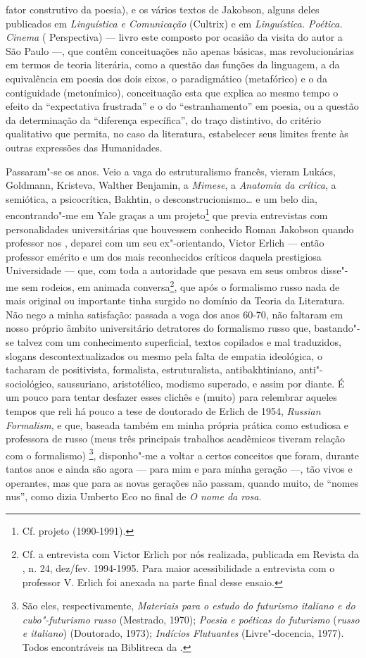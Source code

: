fator construtivo da poesia), e os vários textos de Jakobson, alguns
deles publicados em \emph{Linguística e Comunicação} (Cultrix) e em
\emph{Linguística. Poética. Cinema} ( Perspectiva) --- livro este composto
por ocasião da visita do autor a São Paulo ---, que contêm conceituações
não apenas básicas, mas revolucionárias em termos de teoria literária,
como a questão das funções da linguagem, a da equivalência em poesia dos
dois eixos, o paradigmático (metafórico) e o da contiguidade
(metonímico), conceituação esta que explica ao mesmo tempo o efeito da
``expectativa frustrada'' e o do ``estranhamento'' em poesia, ou a
questão da determinação da ``diferença específica'', do traço
distintivo, do critério qualitativo que permita, no caso da literatura,
estabelecer seus limites frente às outras expressões das Humanidades.

Passaram"-se os anos. Veio a vaga do estruturalismo francês, vieram
Lukács, Goldmann, Kristeva, Walther Benjamin, a \emph{Mimese}, a
\emph{Anatomia da crítica}, a semiótica, a psicocrítica, Bakhtin, o
desconstrucionismo\ldots{} e um belo dia, encontrando"-me em Yale graças a um
projeto\footnote{Cf. projeto  (1990-1991).} que previa
entrevistas com personalidades universitárias que houvessem conhecido
Roman Jakobson quando professor nos , deparei com um seu
ex"-orientando, Victor Erlich --- então professor emérito e um dos mais
reconhecidos críticos daquela prestigiosa Universidade --- que, com toda
a autoridade que pesava em seus ombros disse"-me sem rodeios, em animada
conversa\footnote{Cf. a entrevista com Victor Erlich por nós realizada,
  publicada em Revista da , n. 24, dez/fev. 1994-1995. Para maior
  acessibilidade a entrevista com o professor V. Erlich foi anexada na
  parte final desse ensaio.}, que após o formalismo russo nada de mais
original ou importante tinha surgido no domínio da Teoria da Literatura.
Não nego a minha satisfação: passada a voga dos anos 60-70, não faltaram
em nosso próprio âmbito universitário detratores do formalismo russo
que, bastando"-se talvez com um conhecimento superficial, textos
copilados e mal traduzidos, slogans descontextualizados ou mesmo pela
falta de empatia ideológica, o tacharam de positivista, formalista,
estruturalista, antibakhtiniano, anti"-sociológico, saussuriano,
aristotélico, modismo superado, e assim por diante. É um pouco para
tentar desfazer esses clichês e (muito) para relembrar aqueles tempos
que reli há pouco a tese de doutorado de Erlich de 1954, \emph{Russian
Formalism}, e que, baseada também em minha própria prática como
estudiosa e professora de russo (meus três principais trabalhos
acadêmicos tiveram relação com o formalismo) \footnote{São eles,
  respectivamente, \emph{Materiais para o estudo do futurismo italiano e
  do cubo"-futurismo russo} (Mestrado, 1970); \emph{Poesia e poéticas do
  futurismo} (\emph{russo e italiano}) (Doutorado, 1973); \emph{Indícios
  Flutuantes} (Livre"-docencia, 1977). Todos encontráveis na Biblitreca
  da .}, disponho"-me a voltar a certos conceitos que foram, durante
tantos anos e ainda são agora --- para mim e para minha geração ---, tão
vivos e operantes, mas que para as novas gerações não passam, quando
muito, de ``nomes nus'', como dizia Umberto Eco no final de \emph{O nome
da rosa}.

